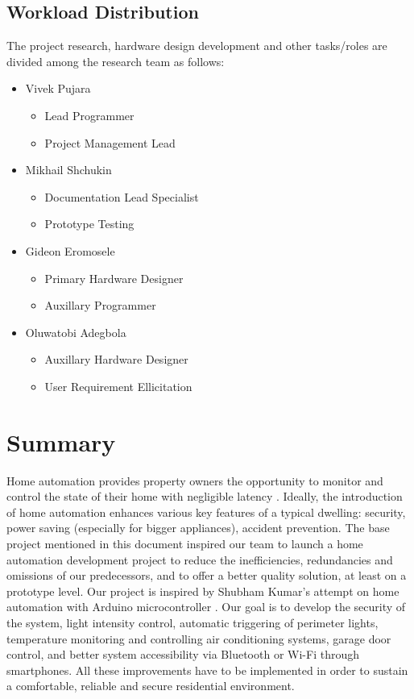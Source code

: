 \documentclass[journal]{IEEEtran}
\begin{document}
\subsection{Workload Distribution}
The project research, hardware design development and other tasks/roles are divided among the research team as follows:
\begin{itemize}
\item{Vivek Pujara}
	\begin{itemize}
	\item{Lead Programmer}
	\item{Project Management Lead}
	\end{itemize}
\item{Mikhail Shchukin}
	\begin{itemize}
	\item{Documentation Lead Specialist}
	\item{Prototype Testing}
	\end{itemize}
\item{Gideon Eromosele}
	\begin{itemize}
	\item{Primary Hardware Designer}
	\item{Auxillary Programmer}
	\end{itemize}
\item{Oluwatobi Adegbola}
	\begin{itemize}
	\item{Auxillary Hardware Designer}
	\item{User Requirement Ellicitation}
	\end{itemize}
\end{itemize}


\section{Summary}
Home automation provides property owners the opportunity to monitor and control the state of their home with negligible latency \textsuperscript{\cite{IEEEhowto:Pavithra}}. Ideally, the introduction of home automation enhances various key features of a typical dwelling: security, power saving (especially for bigger appliances), accident prevention. The base project mentioned in this document inspired our team to launch a home automation development project to reduce the inefficiencies, redundancies and omissions of our predecessors, and to offer a better quality solution, at least on a prototype level. Our project is inspired by Shubham Kumar's attempt on home automation with Arduino microcontroller \textsuperscript{\cite{IEEEhowto:Kumar}}. Our goal is to develop the security of the system, light intensity control, automatic triggering of perimeter lights, temperature monitoring and controlling air conditioning systems, garage door control, and better system accessibility via Bluetooth or Wi-Fi through smartphones. All these improvements have to be implemented in order to sustain a comfortable, reliable and secure residential environment.
\end{document}
